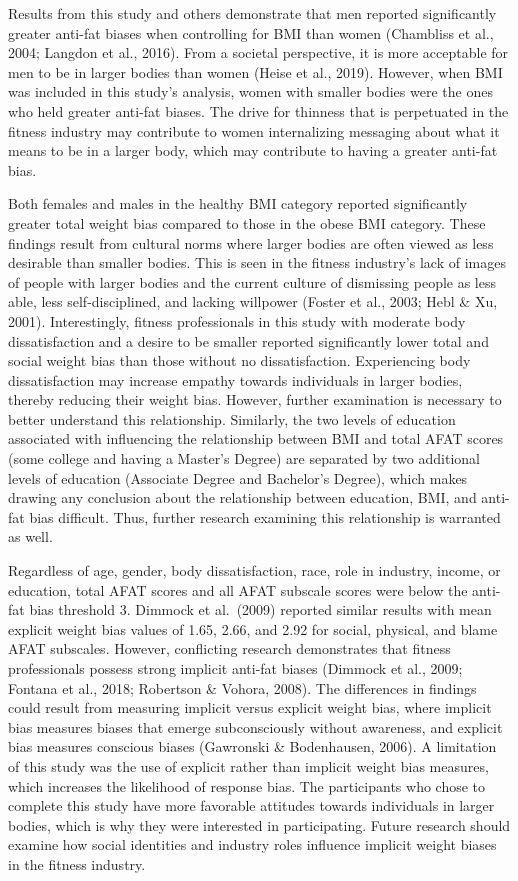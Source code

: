 \documentclass[
  jou,
  longtable,
  nolmodern,
  notxfonts,
  notimes,
  colorlinks=true,linkcolor=blue,citecolor=blue,urlcolor=blue]{apa7}
\begin{document}
Results from this study and others demonstrate that men reported
significantly greater anti-fat biases when controlling for BMI than
women (Chambliss et al., 2004; Langdon et al., 2016). From a societal
perspective, it is more acceptable for men to be in larger bodies than
women (Heise et al., 2019). However, when BMI was included in this
study's analysis, women with smaller bodies were the ones who held
greater anti-fat biases. The drive for thinness that is perpetuated in
the fitness industry may contribute to women internalizing messaging
about what it means to be in a larger body, which may contribute to
having a greater anti-fat bias.

Both females and males in the healthy BMI category reported
significantly greater total weight bias compared to those in the obese
BMI category. These findings result from cultural norms where larger
bodies are often viewed as less desirable than smaller bodies. This is
seen in the fitness industry's lack of images of people with larger
bodies and the current culture of dismissing people as less able, less
self-disciplined, and lacking willpower (Foster et al., 2003; Hebl \&
Xu, 2001). Interestingly, fitness professionals in this study with
moderate body dissatisfaction and a desire to be smaller reported
significantly lower total and social weight bias than those without no
dissatisfaction. Experiencing body dissatisfaction may increase empathy
towards individuals in larger bodies, thereby reducing their weight
bias. However, further examination is necessary to better understand
this relationship. Similarly, the two levels of education associated
with influencing the relationship between BMI and total AFAT scores
(some college and having a Master's Degree) are separated by two
additional levels of education (Associate Degree and Bachelor's Degree),
which makes drawing any conclusion about the relationship between
education, BMI, and anti-fat bias difficult. Thus, further research
examining this relationship is warranted as well.

Regardless of age, gender, body dissatisfaction, race, role in industry,
income, or education, total AFAT scores and all AFAT subscale scores
were below the anti-fat bias threshold 3. Dimmock et al.~(2009) reported
similar results with mean explicit weight bias values of 1.65, 2.66, and
2.92 for social, physical, and blame AFAT subscales. However,
conflicting research demonstrates that fitness professionals possess
strong implicit anti-fat biases (Dimmock et al., 2009; Fontana et al.,
2018; Robertson \& Vohora, 2008). The differences in findings could
result from measuring implicit versus explicit weight bias, where
implicit bias measures biases that emerge subconsciously without
awareness, and explicit bias measures conscious biases (Gawronski \&
Bodenhausen, 2006). A limitation of this study was the use of explicit
rather than implicit weight bias measures, which increases the
likelihood of response bias. The participants who chose to complete this
study have more favorable attitudes towards individuals in larger
bodies, which is why they were interested in participating. Future
research should examine how social identities and industry roles
influence implicit weight biases in the fitness industry.
\end{document}
